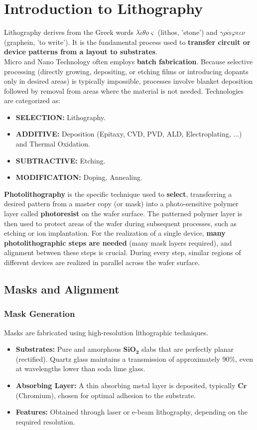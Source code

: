 \documentclass{report}
\begin{document}
\chapter{Introduction to Lithography}
Lithography derives from the Greek words $\lambda\acute{\iota}\theta o\varsigma$ (lithos, 'stone') and $\gamma\rho\acute{\alpha}\varphi\epsilon\iota\nu$ (graphein, 'to write'). It is the fundamental process used to \textbf{transfer circuit or device patterns from a layout to substrates}.\\
Micro and Nano Technology often employs \textbf{batch fabrication}. Because selective processing (directly growing, depositing, or etching films or introducing dopants only in desired areas) is typically impossible, processes involve blanket deposition followed by removal from areas where the material is not needed.
Technologies are categorized as: 
\begin{itemize} 
    \item \textbf{SELECTION:} Lithography. 
    \item \textbf{ADDITIVE:} Deposition (Epitaxy, CVD, PVD, ALD, Electroplating, ...) and Thermal Oxidation. 
    \item \textbf{SUBTRACTIVE:} Etching. 
    \item \textbf{MODIFICATION:} Doping, Annealing. 
\end{itemize}
\textbf{Photolithography} is the specific technique used to \textbf{select}, transferring a desired pattern from a master copy (or mask) into a photo-sensitive polymer layer called \textbf{photoresist} on the wafer surface. The patterned polymer layer is then used to protect areas of the wafer during subsequent processes, such as etching or ion implantation.
For the realization of a single device, \textbf{many photolithographic steps are needed} (many mask layers required), and alignment between these steps is crucial. During every step, similar regions of different devices are realized in parallel across the wafer surface.
\section{Masks and Alignment}
\subsection{Mask Generation} Masks are fabricated using high-resolution lithographic techniques. 
\begin{itemize} 
    \item \textbf{Substrates:} Pure and amorphous $\mathbf{SiO_{2}}$ slabs that are perfectly planar (rectified). Quartz glass maintains a transmission of approximately 90\%, even at wavelengths lower than soda lime glass. 
    \item \textbf{Absorbing Layer:} A thin absorbing metal layer is deposited, typically $\mathbf{Cr}$ (Chromium), chosen for optimal adhesion to the substrate.
    \item \textbf{Features:} Obtained through laser or e-beam lithography, depending on the required resolution. 
\end{itemize}
\end{document}

